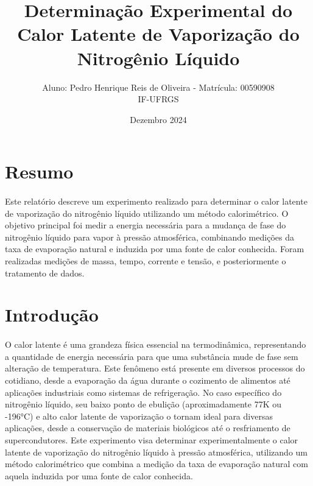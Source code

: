 \documentclass[brazilian,12pt,a4paper,final]{article}
\title{Determinação Experimental do Calor Latente de Vaporização do Nitrogênio Líquido}
\author{Aluno: Pedro Henrique Reis de Oliveira - Matrícula: 00590908 \\ IF-UFRGS}
\date{Dezembro 2024}
\begin{document}
\maketitle
\thispagestyle{fancy} 

\section*{Resumo}
\paragraph{}
Este relatório descreve um experimento realizado para determinar o calor latente de vaporização do nitrogênio líquido utilizando um método calorimétrico. O objetivo principal foi medir a energia necessária para a mudança de fase do nitrogênio líquido para vapor à pressão atmosférica, combinando medições da taxa de evaporação natural e induzida por uma fonte de calor conhecida. Foram realizadas medições de massa, tempo, corrente e tensão, e posteriormente o tratamento de dados.

\section{Introdução}
\paragraph{}

O calor latente é uma grandeza física essencial na termodinâmica, representando a quantidade de energia necessária para que uma substância mude de fase sem alteração de temperatura. Este fenômeno está presente em diversos processos do cotidiano, desde a evaporação da água durante o cozimento de alimentos até aplicações industriais como sistemas de refrigeração. No caso específico do nitrogênio líquido, seu baixo ponto de ebulição (aproximadamente 77K ou -196°C) e alto calor latente de vaporização o tornam ideal para diversas aplicações, desde a conservação de materiais biológicos até o resfriamento de supercondutores. Este experimento visa determinar experimentalmente o calor latente de vaporização do nitrogênio líquido à pressão atmosférica, utilizando um método calorimétrico que combina a medição da taxa de evaporação natural com aquela induzida por uma fonte de calor conhecida.
\end{document}
